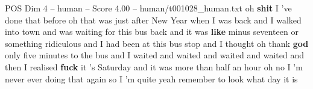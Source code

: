 \begin{textsample}{POS Dim 4 – human – Score 4.00 – human/t001028\_human.txt}  \label{ex:f4_pos_007}
oh \textbf{shit} I 've done that before oh that was just after New Year when I was back and I walked into town and was waiting for this bus back and it was \textbf{like} minus seventeen or something ridiculous and I had been at this bus stop and I thought oh thank \textbf{god} only five minutes to the bus and I waited and waited and waited and waited and then I realised \textbf{fuck} it 's Saturday and it was more than half an hour oh no I 'm never ever doing that again so I 'm quite yeah remember to look what day it is

\end{textsample}
